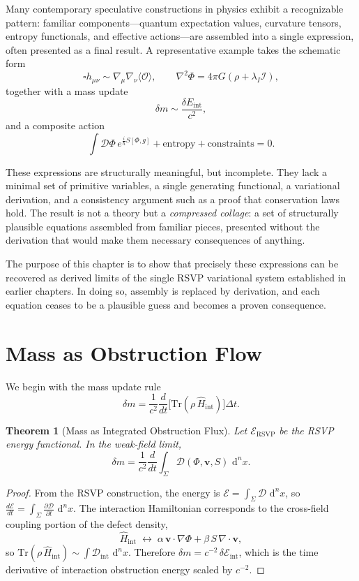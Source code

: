 \documentclass[12pt,a4paper,openany]{book}
\theoremstyle{plain}
\newtheorem{theorem}{Theorem}[chapter]
\theoremstyle{definition}
\theoremstyle{remark}
\newcommand{\dvol}{\,\mathrm{d}^n x}
\begin{document}
Many contemporary speculative constructions in physics exhibit a recognizable pattern: familiar components---quantum expectation values, curvature tensors, entropy functionals, and effective actions---are assembled into a single expression, often presented as a final result. A representative example takes the schematic form
\[
\square h_{\mu\nu} \sim \nabla_\mu \nabla_\nu \langle \mathcal{O} \rangle,
\qquad
\nabla^2 \Phi = 4\pi G(\rho + \lambda_I \mathcal{I}),
\]
together with a mass update
\[
\delta m \sim \frac{\delta E_{\mathrm{int}}}{c^2},
\]
and a composite action
\[
\int \mathcal{D}\Phi\, e^{\frac{i}{\hbar} S[\Phi,g]} + \text{entropy} + \text{constraints} = 0.
\]

These expressions are structurally meaningful, but incomplete. They lack a minimal set of primitive variables, a single generating functional, a variational derivation, and a consistency argument such as a proof that conservation laws hold. The result is not a theory but a \emph{compressed collage}: a set of structurally plausible equations assembled from familiar pieces, presented without the derivation that would make them necessary consequences of anything.

The purpose of this chapter is to show that precisely these expressions can be recovered as derived limits of the single RSVP variational system established in earlier chapters. In doing so, assembly is replaced by derivation, and each equation ceases to be a plausible guess and becomes a proven consequence.

\section{Mass as Obstruction Flow}

We begin with the mass update rule
\[
\delta m = \frac{1}{c^2}\frac{d}{dt}\bigl[\mathrm{Tr}(\rho\, \hat{H}_{\mathrm{int}})\bigr]\Delta t.
\]

\begin{theorem}[Mass as Integrated Obstruction Flux]
\label{thm:mass_obstruction}
Let $\mathcal{E}_{\mathrm{RSVP}}$ be the RSVP energy functional. In the weak-field limit,
\[
\delta m = \frac{1}{c^2}\frac{d}{dt}\int_\Sigma \mathcal{D}(\Phi,\mathbf{v},S)\,\dvol.
\]
\end{theorem}

\begin{proof}
From the RSVP construction, the energy is $\mathcal{E} = \int_\Sigma \mathcal{D}\,\dvol$, so $\frac{d\mathcal{E}}{dt} = \int_\Sigma \frac{\partial \mathcal{D}}{\partial t}\,\dvol$. The interaction Hamiltonian corresponds to the cross-field coupling portion of the defect density,
\[
\hat{H}_{\mathrm{int}} \;\longleftrightarrow\; \alpha\,\mathbf{v}\cdot\nabla\Phi + \beta\, S\,\nabla\cdot\mathbf{v},
\]
so $\mathrm{Tr}(\rho\,\hat{H}_{\mathrm{int}}) \sim \int \mathcal{D}_{\mathrm{int}}\,\dvol$. Therefore $\delta m = c^{-2}\,\delta\mathcal{E}_{\mathrm{int}}$, which is the time derivative of interaction obstruction energy scaled by $c^{-2}$.
\end{proof}
\end{document}
